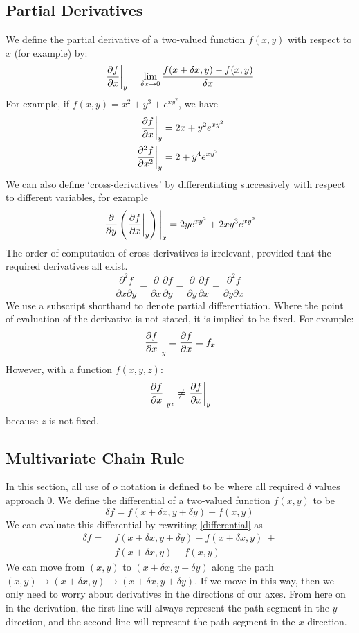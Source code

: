 \subsection{Partial Derivatives}
We define the partial derivative of a two-valued function \(f(x, y)\) with respect to \(x\) (for example) by:
\begin{equation}
	\eval{\frac{\partial f}{\partial x}}_{y} = \lim_{\delta x\to 0} \frac{f(x + \delta x, y) - f(x, y)}{\delta x}
\end{equation}
For example, if \(f(x,y) = x^2 + y^3 + e^{xy^2}\), we have
\begin{align*}
	\eval{\frac{\partial f}{\partial x}}_{y}     & = 2x + y^2 e^{xy^2} \\
	\eval{\frac{\partial^2 f}{\partial x^2}}_{y} & = 2 + y^4 e^{xy^2}
\end{align*}
We can also define `cross-derivatives' by differentiating successively with respect to different variables, for example
\[
	\eval{\frac{\partial}{\partial y} \left( \eval{\frac{\partial f}{\partial x}}_{y} \right)}_{x} = 2ye^{xy^2} + 2xy^3e^{xy^2}
\]
The order of computation of cross-derivatives is irrelevant, provided that the required derivatives all exist.
\begin{equation}
	\frac{\partial^2 f}{\partial x \partial y} = \frac{\partial}{\partial x}\frac{\partial f}{\partial y} = \frac{\partial}{\partial y}\frac{\partial f}{\partial x} = \frac{\partial^2 f}{\partial y \partial x}
\end{equation}
We use a subscript shorthand to denote partial differentiation.
Where the point of evaluation of the derivative is not stated, it is implied to be fixed.
For example:
\[
	\eval{\frac{\partial f}{\partial x}}_{y} = \frac{\partial f}{\partial x} = f_x
\]
However, with a function \(f(x, y, z)\):
\[
	\eval{\frac{\partial f}{\partial x}}_{yz} \neq \eval{\frac{\partial f}{\partial x}}_{y}
\]
because \(z\) is not fixed.

\subsection{Multivariate Chain Rule}
In this section, all use of \(o\) notation is defined to be where all required \(\delta\) values approach 0.
We define the differential of a two-valued function \(f(x, y)\) to be
\begin{equation}\label{differential}
	\delta f = f(x + \delta x, y + \delta y) - f(x, y)
\end{equation}
We can evaluate this differential by rewriting \eqref{differential} as
\begin{align*}
	\delta f =\  & f(x + \delta x, y + \delta y) - f(x + \delta x, y)\ + \\
	             & f(x + \delta x, y) - f(x, y)
\end{align*}
We can move from \((x, y)\) to \((x + \delta x, y + \delta y)\) along the path \((x, y) \to (x + \delta x, y) \to (x + \delta x, y + \delta y)\).
If we move in this way, then we only need to worry about derivatives in the directions of our axes.
From here on in the derivation, the first line will always represent the path segment in the \(y\) direction, and the second line will represent the path segment in the \(x\) direction.

